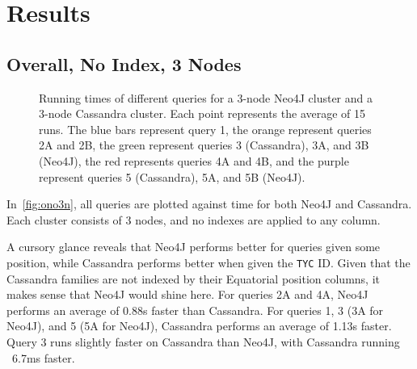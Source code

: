 \section{Results}\label{sec:results}

\subsection{Overall, No Index, 3 Nodes}\label{subsec:overall,NoIndex,3Nodes}
\begin{figure}
    \caption{Running times of different queries for a 3-node Neo4J cluster and a 3-node Cassandra cluster.
    Each point represents the average of 15 runs.
    The blue bars represent query 1, the orange represent queries 2A and 2B, the green represent queries 3
    (Cassandra), 3A, and 3B (Neo4J), the red represents queries 4A and 4B, and the purple represent queries 5
    (Cassandra), 5A, and 5B (Neo4J).}\label{fig:ono3n}
\end{figure}

In~\autoref{fig:ono3n}, all queries are plotted against time for both Neo4J and Cassandra.
Each cluster consists of 3 nodes, and no indexes are applied to any column.

A cursory glance reveals that Neo4J performs better for queries given some position, while
Cassandra performs better when given the \texttt{TYC} ID\@.
Given that the Cassandra families are not indexed by their Equatorial position columns, it makes sense
that Neo4J would shine here.
For queries 2A and 4A, Neo4J performs an average of 0.88s faster than Cassandra.
For queries 1, 3 (3A for Neo4J), and 5 (5A for Neo4J), Cassandra performs an average of 1.13s faster.
Query 3 runs slightly faster on Cassandra than Neo4J, with Cassandra running ~6.7ms faster.

